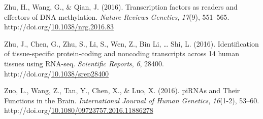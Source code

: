 \documentclass[12pt,twoside]{reedthesis}
\newlength{\cslhangindent}
\newenvironment{CSLReferences}[2] %
 {%
  \setlength{\parindent}{0pt}
  \ifodd #1 \everypar{\setlength{\hangindent}{\cslhangindent}}\ignorespaces\fi
  \ifnum #2 > 0
  \setlength{\parskip}{#2\baselineskip}
  \fi
 }%
 {}
\begin{document}
\begin{CSLReferences}{1}{0}
\leavevmode{}%
Zhu, H., Wang, G., \& Qian, J. (2016). Transcription factors as readers and effectors of DNA methylation. \emph{Nature Reviews Genetics}, \emph{17}(9), 551--565. http://doi.org/\href{https://doi.org/10.1038/nrg.2016.83}{10.1038/nrg.2016.83}

\leavevmode{}%
Zhu, J., Chen, G., Zhu, S., Li, S., Wen, Z., Bin Li, \ldots{} Shi, L. (2016). Identification of tissue-specific protein-coding and noncoding transcripts across 14 human tissues using RNA-seq. \emph{Scientific Reports}, \emph{6}, 28400. http://doi.org/\href{https://doi.org/10.1038/srep28400}{10.1038/srep28400}

\leavevmode{}%
Zuo, L., Wang, Z., Tan, Y., Chen, X., \& Luo, X. (2016). piRNAs and Their Functions in the Brain. \emph{International Journal of Human Genetics}, \emph{16}(1-2), 53--60. http://doi.org/\href{https://doi.org/10.1080/09723757.2016.11886278}{10.1080/09723757.2016.11886278}

\end{CSLReferences}

\end{document}
